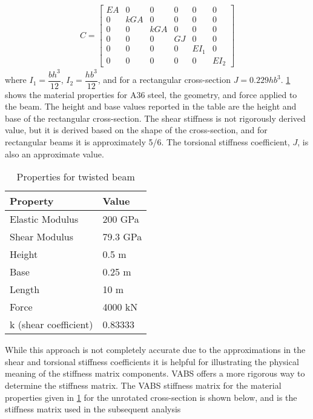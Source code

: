 \documentclass[letterpaper,12pt]{article}
\begin{document}
\begin{align*} 
C = \begin{bmatrix}
	EA & 0   & 0   & 0  & 0    & 0    \\
	0  & kGA & 0   & 0  & 0    & 0    \\
	0  & 0   & kGA & 0  & 0    & 0    \\
	0  & 0   & 0   & GJ & 0    & 0    \\
	0  & 0   & 0   & 0  & EI_1 & 0    \\
	0  & 0   & 0   & 0  & 0    & EI_2
\end{bmatrix}
\end{align*}
where $I_1 = \dfrac{bh^3}{12}$, $I_2 = \dfrac{hb^3}{12}$, and for a rectangular cross-section $J = 0.229hb^3$. \ref{tab:1} shows the material properties for A36 steel, the geometry, and force applied to the beam. The height and base values reported in the table are the height and base of the rectangular cross-section. The shear stiffness is not rigorously derived value, but it is derived based on the shape of the cross-section, and for rectangular beams it is approximately 5/6. The torsional stiffness coefficient, $J$, is also an approximate value.

\begin{table}
\caption{\label{tab:1} Properties for twisted beam}
\begin{center}
    \begin{tabular}{| l | l |}
    	\hline
    	Property               & Value   \\ \hline
    	Elastic Modulus                      & 200 GPa \\ \hline
    	Shear Modulus                      & 79.3 GPa \\ \hline
    	Height                      & 0.5 m   \\ \hline
    	Base                      & 0.25 m  \\ \hline
    	Length                      & 10 m    \\ \hline
    	Force                      & 4000 kN \\ \hline
    	k (shear coefficient) & 0.83333    \\ \hline
    \end{tabular}
\end{center}
\end{table}

While this approach is not completely accurate due to the approximations in the shear and torsional stiffness coefficients it is helpful for illustrating the physical meaning of the stiffness matrix components. VABS offers a more rigorous way to determine the stiffness matrix. The VABS stiffness matrix for the material properties given in \ref{tab:1} for the unrotated cross-section is shown below, and is the stiffness matrix used in the subsequent analysis
\end{document}
